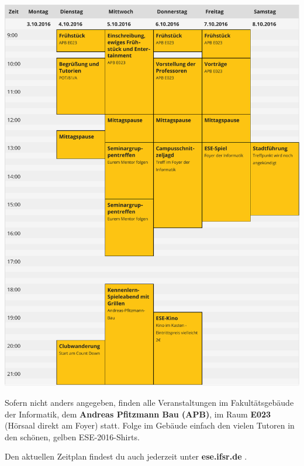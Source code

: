 %



\begin{center}
  \vspace*{-7em}
  \includegraphics[height=.75\dimen108,keepaspectratio]{img/zeitplan.pdf}%
  
  \small
  \vfill
  \enlargethispage{2em}
  
  Sofern nicht anders angegeben, finden alle Veranstaltungen im Fakultätsgebäude der Informatik, dem
  \textbf{Andreas Pfitzmann Bau (APB)}, im Raum \textbf{E023} (Hörsaal direkt am Foyer) statt.
  Folge im Gebäude einfach den vielen Tutoren in den schönen, gelben ESE-2016-Shirts.

  Den aktuellen Zeitplan findest du auch jederzeit unter \textbf{ese.ifsr.de} .
\end{center}

